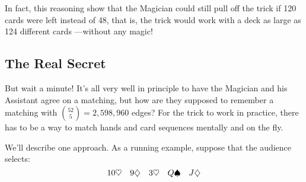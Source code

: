 In fact, this reasoning show that the Magician could still pull off the
trick if 120 cards were left instead of 48, that is, the trick would work
with a deck as large as 124 different cards ---without any magic!

\subsection{The Real Secret}

But wait a minute!  It's all very well in principle to have the Magician
and his Assistant agree on a matching, but how are they supposed to
remember a matching with $\binom{52}{5} = 2,598,960$ edges?  For the trick
to work in practice, there has to be a way to match hands and card
sequences mentally and on the fly.

We'll describe one approach.  As a running example, suppose that the
audience selects:
%
\[
10 \heartsuit \quad 9 \diamondsuit \quad 3 \heartsuit \quad Q \spadesuit \quad J \diamondsuit
\]

